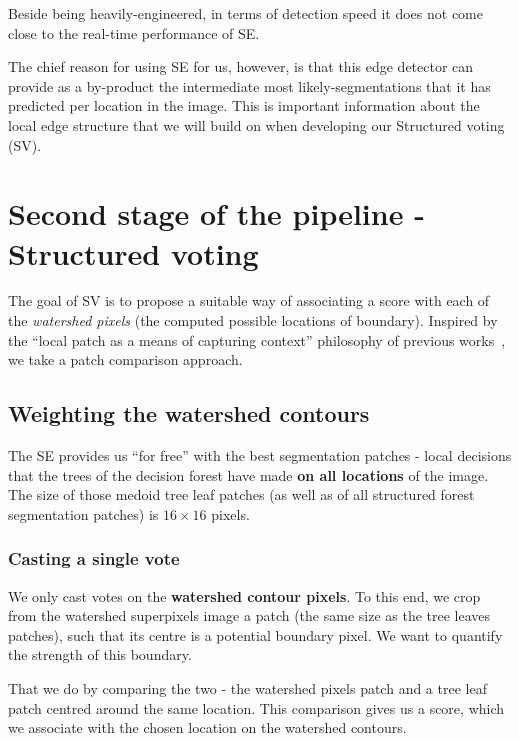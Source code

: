 Beside being heavily-engineered, in terms of detection speed it does not come close to the real-time performance of SE.

The chief reason for using SE for us, however, is that this edge detector can provide as a by-product the intermediate most likely-segmentations that it has predicted per location in the image. This is important information about the local edge structure that we will build on when developing our Structured voting (SV).

\section{Second stage of the pipeline - Structured voting}
\label{sec:ch4-SE-SV-UCM_SV_details}
The goal of SV is to propose a suitable way of associating a score with each of the {\it watershed pixels} (the computed possible locations of boundary). Inspired by the ``local patch as a means of capturing context'' philosophy of previous works~\cite{Dollar2006supervised,LimZD13,DollarICCV13edges}, we take a patch comparison approach.

\subsection{Weighting the watershed contours} %
The SE provides us ``for free'' with the best segmentation patches - local decisions that the trees of the decision forest have made {\bf on all locations} of the image. The size of those medoid tree leaf patches (as well as of all structured forest segmentation patches) is $16\times 16$ pixels.

\subsubsection{Casting a single vote}
We only cast votes on the {\bf watershed contour pixels}. To this end, we crop from the watershed superpixels image a patch (the same size as the tree leaves patches), such that its centre is a potential boundary pixel. We want to quantify the strength of this boundary. 

That we do by comparing the two - the watershed pixels patch and a tree leaf patch centred around the same location. This comparison gives us a score, which we associate with the chosen location on the watershed contours.

